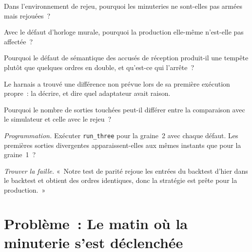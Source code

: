 \begin{exercise}[$\star$]\label{exo:pl:simulation-production-parity:2}
Dans l'environnement de rejeu, pourquoi les minuteries ne sont-elles pas armées mais rejouées~?
\end{exercise}

\begin{exercise}[$\star$]\label{exo:pl:simulation-production-parity:3}
Avec le défaut d'horloge murale, pourquoi la production elle-même n'est-elle pas affectée~?
\end{exercise}

\begin{exercise}[$\star\star$]\label{exo:pl:simulation-production-parity:4}
Pourquoi le défaut de sémantique des accusés de réception produit-il une tempête plutôt que quelques ordres en double, et qu'est-ce qui l'arrête~?
\end{exercise}

\begin{exercise}[$\star\star$]\label{exo:pl:simulation-production-parity:5}
Le harnais a trouvé une différence non prévue lors de sa première exécution propre~: la décrire, et dire quel adaptateur avait raison.
\end{exercise}

\begin{exercise}[$\star\star$]\label{exo:pl:simulation-production-parity:6}
Pourquoi le nombre de sorties touchées peut-il différer entre la comparaison avec le simulateur et celle avec le rejeu~?
\end{exercise}

\begin{exercise}[$\star\star\star$]\label{exo:pl:simulation-production-parity:7}
\emph{Programmation.} Exécuter \texttt{run\_three} pour la graine~2 avec chaque défaut. Les premières sorties divergentes apparaissent-elles aux mêmes instants que pour la graine~1~?
\end{exercise}

\begin{exercise}[$\star\star\star$]\label{exo:pl:simulation-production-parity:8}
\emph{Trouver la faille.} «~Notre test de parité rejoue les entrées du backtest d'hier dans le backtest et obtient des ordres identiques, donc la stratégie
est prête pour la production.~»
\end{exercise}

\section{Problème~: Le matin où la minuterie s'est déclenchée}

